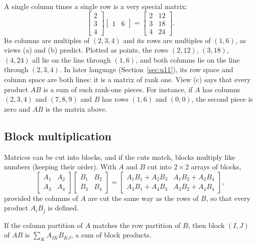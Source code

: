 A single column times a single row is a very special matrix:
\[
  \begin{bmatrix} 2\\ 3\\ 4\end{bmatrix}\begin{bmatrix} 1 & 6\end{bmatrix}
  =\begin{bmatrix} 2 & 12\\ 3 & 18\\ 4 & 24\end{bmatrix}.
\]
Its columns are multiples of $(2,3,4)$ and its rows are multiples of $(1,6)$, as views (a)
and (b) predict. Plotted as points, the rows $(2,12)$, $(3,18)$, $(4,24)$ all lie on the line
through $(1,6)$, and both columns lie on the line through $(2,3,4)$. In later language
(Section~\ref{sec:u11}), its row space and column space are both lines: it is a matrix of
rank one. View (c) says that every product $AB$ is a sum of such rank-one pieces. For
instance, if $A$ has columns $(2,3,4)$ and $(7,8,9)$ and $B$ has rows $(1,6)$ and $(0,0)$,
the second piece is zero and $AB$ is the matrix above.

\subsection{Block multiplication}

Matrices can be cut into blocks, and if the cuts match, blocks multiply like numbers
(keeping their order). With $A$ and $B$ cut into $2\times2$ arrays of blocks,
\[
  \begin{bmatrix} A_1 & A_2\\ A_3 & A_4\end{bmatrix}
  \begin{bmatrix} B_1 & B_2\\ B_3 & B_4\end{bmatrix}
  =\begin{bmatrix} A_1B_1+A_2B_3 & A_1B_2+A_2B_4\\ A_3B_1+A_4B_3 & A_3B_2+A_4B_4\end{bmatrix},
\]
provided the columns of $A$ are cut the same way as the rows of $B$, so that every product
$A_iB_j$ is defined.

\begin{proposition}\label{prop:u04-blocks}
If the column partition of $A$ matches the row partition of $B$, then block $(I,J)$ of $AB$
is $\sum_K A_{IK}B_{KJ}$, a sum of block products.
\end{proposition}

